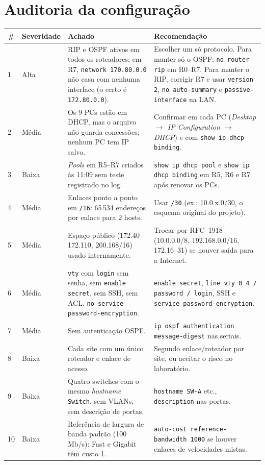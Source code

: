 \documentclass[12pt,a4paper]{article}
\begin{document}
\section{Auditoria da configuração}\label{sec:auditoria}
\begin{longtable}{@{}p{0.6cm}p{2cm}p{5.2cm}p{6.2cm}@{}}\toprule
\# & Severidade & Achado & Recomendação\\\midrule\endhead
1 & Alta & RIP e OSPF ativos em todos os roteadores; em R7, \texttt{network 170.80.0.0} não casa com nenhuma interface (o certo é \texttt{172.80.0.0}). & Escolher um só protocolo. Para manter só o OSPF: \texttt{no router rip} em R0--R7. Para manter o RIP, corrigir R7 e usar \texttt{version 2}, \texttt{no auto-summary} e \texttt{passive-interface} na LAN.\\
2 & Média & Os 9 PCs estão em DHCP, mas o arquivo não guarda concessões; nenhum PC tem IP salvo. & Confirmar em cada PC (\textit{Desktop $\to$ IP Configuration $\to$ DHCP}) e com \texttt{show ip dhcp binding}.\\
3 & Baixa & \textit{Pools} em R5--R7 criados às 11:09 sem teste registrado no log. & \texttt{show ip dhcp pool} e \texttt{show ip dhcp binding} em R5, R6 e R7 após renovar os PCs.\\
4 & Média & Enlaces ponto a ponto em \texttt{/16}: 65\,534 endereços por enlace para 2 hosts. & Usar \texttt{/30} (ex.: 10.0.x.0/30, o esquema original do projeto).\\
5 & Média & Espaço público (172.40--172.110, 200.168/16) usado internamente. & Trocar por RFC~1918 (10.0.0.0/8, 192.168.0.0/16, 172.16--31) se houver saída para a Internet.\\
6 & Média & \texttt{vty} com \texttt{login} sem senha, sem \texttt{enable secret}, sem SSH, sem ACL, \texttt{no service password-encryption}. & \texttt{enable secret}, \texttt{line vty 0 4 / password / login}, SSH e \texttt{service password-encryption}.\\
7 & Média & Sem autenticação OSPF. & \texttt{ip ospf authentication message-digest} nas seriais.\\
8 & Baixa & Cada site com um único roteador e enlace de acesso. & Segundo enlace/roteador por site, ou aceitar o risco no laboratório.\\
9 & Baixa & Quatro switches com o mesmo \textit{hostname} \texttt{Switch}, sem VLANs, sem descrição de portas. & \texttt{hostname SW-A} etc., \texttt{description} nas portas.\\
10 & Baixa & Referência de largura de banda padrão (100 Mb/s): Fast e Gigabit têm custo 1. & \texttt{auto-cost reference-bandwidth 1000} se houver enlaces de velocidades mistas.\\

\end{longtable}
\end{document}
